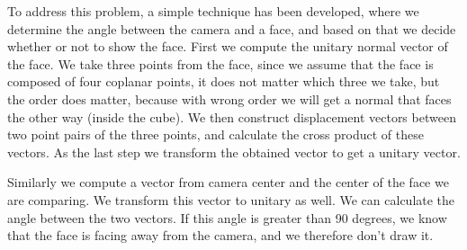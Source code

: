 To address this problem, a simple technique has been developed, where we determine the angle between the camera and a face, and based on that we decide whether or not to show the face. First we compute the unitary normal vector of the face. We take three points from the face, since we assume that the face is composed of four coplanar points, it does not matter which three we take, but the order does matter, because with wrong order we will get a normal that faces the other way (inside the cube). We then construct displacement vectors between two point pairs of the three points, and calculate the cross product of these vectors. As the last step we transform the obtained vector to get a unitary vector. 

Similarly we compute a vector from camera center and the center of the face we are comparing. We transform this vector to unitary as well. We can calculate the angle between the two vectors. If this angle is greater than 90 degrees, we know that the face is facing away from the camera, and we therefore don't draw it.

